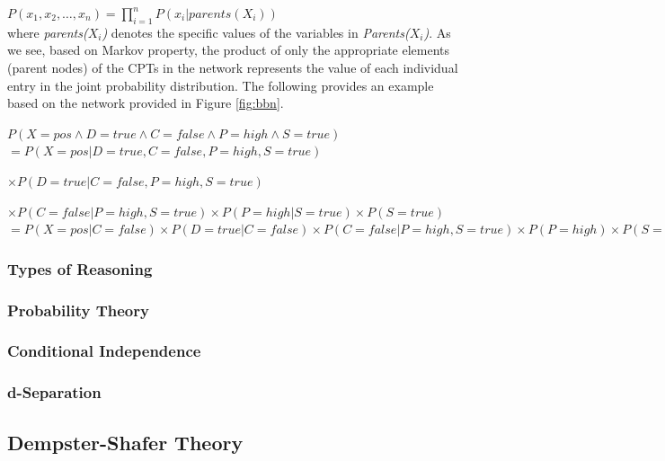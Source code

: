 \documentclass[11pt]{article}
\begin{document}
$P(x_1, x_2, \ldots, x_n) = \prod\limits_{i=1}^{n} P(x_i | parents (X_i))$\\	

\noindent where \textit{parents($X_i$)} denotes the specific values of the
variables in \textit{Parents($X_i$)}. As we see, based on Markov property, the
product of only the appropriate elements (parent nodes) of the CPTs in the
network represents the value of each individual entry in the joint probability
distribution. The following provides an example based on the network provided in
Figure \ref{fig:bbn}.\\

\begin{footnotesize}
\noindent $P(X= pos \wedge D = true \wedge C = false \wedge P = high \wedge S =
true)$\\

\noindent $= P(X= pos | D = true , C = false , P = high , S = true)$

\noindent $\times P(D = true | C = false , P = high , S = true)$

\noindent $\times P(C = false | P = high , S = true) \times P(P = high| S =
true) \times P(S = true)$\\

\noindent $= P(X= pos | C = false) \times P(D = true | C = false) \times P(C =
false | P = high , S = true) \times P(P = high) \times P(S = true)$
\end{footnotesize}

\subsubsection{Types of Reasoning}

\subsubsection{Probability Theory}

\subsubsection{Conditional Independence}

\subsubsection{d-Separation}

\subsection{Dempster-Shafer Theory}
\end{document}
